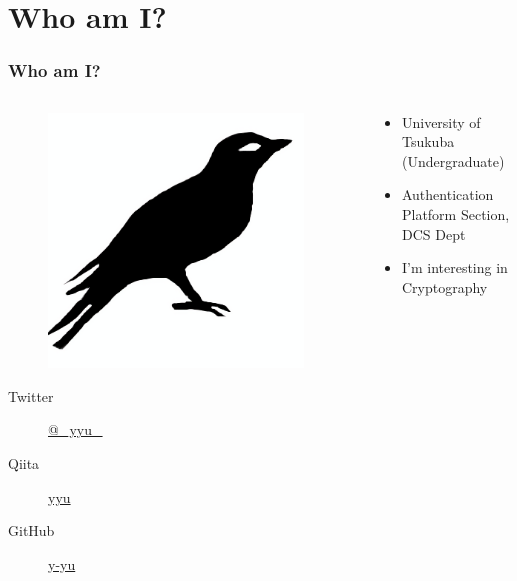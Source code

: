 \section{Who am I?}
\begin{frame}
  \frametitle{Who am I?}
  
  \begin{columns}
    \begin{column}{0.3\textwidth}
      \centering
      \begin{figure}
        \includegraphics[width=0.95\textwidth]{img/bird2x.png}
      \end{figure}

      \begin{description}
        \item[Twitter] \href{https://twitter.com/\_yyu\_}{@\_yyu\_}
        \item[Qiita] \href{http://qiita.com/yyu}{yyu}
        \item[GitHub] \href{https://github.com/y-yu}{y-yu}
      \end{description}
    \end{column}
    \begin{column}{0.7\textwidth}
      \begin{itemize}
        \item<2-> University of Tsukuba (Undergraduate)
        \item<3-> Authentication Platform Section, DCS Dept
        \item<4-> I'm interesting in Cryptography
      \end{itemize}
    \end{column}
  \end{columns}
\end{frame}

